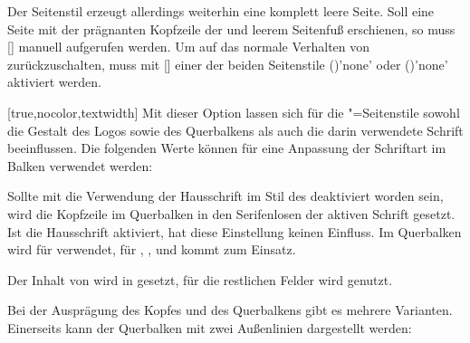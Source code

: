 \begin{Declaration*}{}
\begin{Declaration*}{}
\begin{Declaration*}{}
\begin{Declaration}[v2.02]{}
\begin{Declaration}[v2.02]{}
\begin{Declaration}[v2.02]{}
Der Seitenstil  erzeugt allerdings weiterhin eine komplett 
leere Seite. Soll eine Seite mit der prägnanten Kopfzeile der \TnUD und leerem 
Seitenfuß erschienen, so muss []
manuell aufgerufen werden. Um auf das normale Verhalten von \KOMAScript{} 
zurückzuschalten, muss mit [] einer der 
beiden Seitenstile ()'none'
oder ()'none' aktiviert 
werden.
%
\end{Declaration}
\end{Declaration}
\end{Declaration}

\begin{Declaration}[%
  v2.03;%
  v2.04!\Option{cdhead=barcolor}:nur farbig abgesetzter Querbalken;%
  v2.05!\Option{cdhead=date}:Datum zwischen Kopf- und Textbereich;%
]{}[true,nocolor,textwidth]
\printdeclarationlist%
%
%
%
%
%
Mit dieser Option lassen sich für die "=Seitenstile 
sowohl die Gestalt des Logos sowie des Querbalkens als auch die darin 
verwendete Schrift beeinflussen. Die folgenden Werte können für eine Anpassung 
der Schriftart im Balken verwendet werden:
%
\begin{values}{}
\itemfalse
  Sollte mit  die Verwendung der Hausschrift im Stil des 
  \TUDCDs deaktiviert worden sein, wird die Kopfzeile im Querbalken in den 
  Serifenlosen der aktiven Schrift gesetzt. Ist die Hausschrift aktiviert, 
  hat diese Einstellung keinen Einfluss.
  Im Querbalken wird für   
  verwendet, für , , 
   und  kommt  zum 
  Einsatz.
\item[heavy/heavyfont]
  Der Inhalt von  wird in  gesetzt, für 
  die restlichen Felder wird  genutzt.
\end{values}
%
Bei der Ausprägung des Kopfes und des Querbalkens gibt es mehrere Varianten. 
Einerseits kann der Querbalken mit zwei Außenlinien dargestellt werden:
%
\begin{values}{}
\item[nocolor/monochrome]

\end{values}
\end{Declaration}
\end{Declaration*}
\end{Declaration*}
\end{Declaration*}
